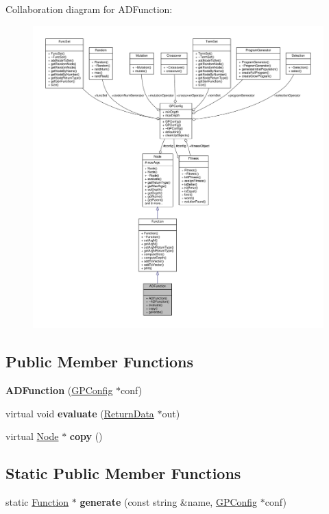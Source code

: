 Collaboration diagram for A\+D\+Function\+:
\nopagebreak
\begin{figure}[H]
\begin{center}
\leavevmode
\includegraphics[width=350pt]{classADFunction__coll__graph}
\end{center}
\end{figure}
\subsection*{Public Member Functions}
\begin{DoxyCompactItemize}
\item 
\hypertarget{classADFunction_ac498ec67ffe4b56132621557f5acf44d}{}\label{classADFunction_ac498ec67ffe4b56132621557f5acf44d} 
{\bfseries A\+D\+Function} (\hyperlink{classGPConfig}{G\+P\+Config} $\ast$conf)
\item 
\hypertarget{classADFunction_a01062cbb089c4ef86091c0f6e4757649}{}\label{classADFunction_a01062cbb089c4ef86091c0f6e4757649} 
virtual void {\bfseries evaluate} (\hyperlink{classReturnData}{Return\+Data} $\ast$out)
\item 
\hypertarget{classADFunction_a1c23913e64d27ab6314617c35b9418b1}{}\label{classADFunction_a1c23913e64d27ab6314617c35b9418b1} 
virtual \hyperlink{classNode}{Node} $\ast$ {\bfseries copy} ()
\end{DoxyCompactItemize}
\subsection*{Static Public Member Functions}
\begin{DoxyCompactItemize}
\item 
\hypertarget{classADFunction_abd55170dadd403e819ad2d44ca699366}{}\label{classADFunction_abd55170dadd403e819ad2d44ca699366} 
static \hyperlink{classFunction}{Function} $\ast$ {\bfseries generate} (const string \&name, \hyperlink{classGPConfig}{G\+P\+Config} $\ast$conf)
\end{DoxyCompactItemize}

